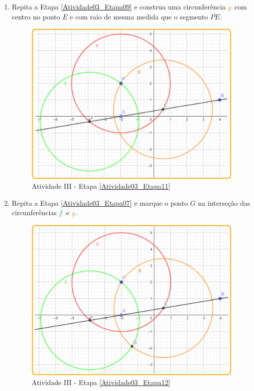 \documentclass[11pt,a4paper]{article}
\begin{document}
\begin{enumerate}[{Etapa} 1.]
\item Repita a Etapa \ref{Atividade03_Etapa09} e construa uma circunferência ${\color{orange}{g}}$ com centro no ponto $E$ e com raio de mesma medida que o segmento $\overline{PE}$. \label{Atividade03_Etapa11}
\begin{figure}[H]
    \centering
    \includegraphics[height=8cm]{Figuras/T01_Atividade03_Fig03.png}
    \caption{Atividade III - Etapa \ref{Atividade03_Etapa11}}
    \label{Atividade03_Etapa11_Imagem}
\end{figure}

\item Repita a Etapa \ref{Atividade03_Etapa07} e marque o ponto $G$ na interseção das circunferências ${\color{ForestGreen}{f}}$ e ${\color{orange}{g}}$. \label{Atividade03_Etapa12}
\begin{figure}[H]
    \centering
    \includegraphics[height=8cm]{Figuras/T01_Atividade03_Fig04.png}
    \caption{Atividade III - Etapa \ref{Atividade03_Etapa12}}
    \label{Atividade03_Etapa12_Imagem}
\end{figure}


\end{enumerate}
\end{document}
